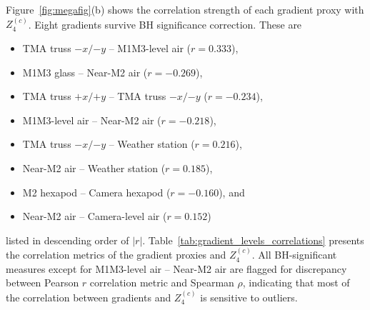 \documentclass[SE,authoryear,toc]{lsstdoc}
\begin{document}
Figure~\ref{fig:megafig}(b) shows the correlation strength of each gradient proxy with $Z_4^{(c)}$. Eight gradients  survive BH significance correction. These are 
\begin{itemize}
    \item TMA truss $-x/{-y}$ -- M1M3-level air ($r=0.333$),
    \item M1M3 glass -- Near-M2 air ($r=-0.269$),
    \item TMA truss $+x/{+y}$ -- TMA truss $-x/{-y}$ ($r=-0.234$),
    \item M1M3-level air -- Near-M2 air ($r=-0.218$),
    \item TMA truss $-x/{-y}$ -- Weather station ($r=0.216$),
    \item Near-M2 air -- Weather station ($r=0.185$),
    \item M2 hexapod -- Camera hexapod ($r=-0.160$), and
    \item Near-M2 air -- Camera-level air ($r=0.152$)
\end{itemize}
listed in descending order of $|r|$. Table~\ref{tab:gradient_levels_correlations} presents the correlation metrics of the gradient proxies and $Z_4^{(c)}$. All BH-significant measures except for M1M3-level air -- Near-M2 air are flagged for discrepancy between Pearson $r$ correlation metric and Spearman $\rho$, indicating that most of the correlation between gradients and $Z_4^{(c)}$ is sensitive to outliers.
\end{document}
